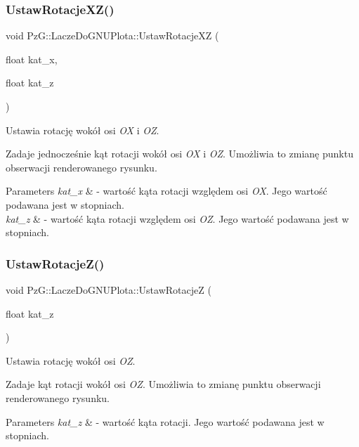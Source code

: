 \subsubsection{\texorpdfstring{Ustaw\+Rotacje\+X\+Z()}{UstawRotacjeXZ()}}
{\footnotesize\ttfamily void Pz\+G\+::\+Lacze\+Do\+G\+N\+U\+Plota\+::\+Ustaw\+Rotacje\+XZ (\begin{DoxyParamCaption}\item[{float}]{kat\+\_\+x,  }\item[{float}]{kat\+\_\+z }\end{DoxyParamCaption})\hspace{0.3cm}{\ttfamily [inline]}}



Ustawia rotację wokół osi {\itshape OX} i {\itshape OZ}. 

Zadaje jednocześnie kąt rotacji wokół osi {\itshape OX} i {\itshape OZ}. Umożliwia to zmianę punktu obserwacji renderowanego rysunku. 
\begin{DoxyParams}{Parameters}
{\em kat\+\_\+x} & -\/ wartość kąta rotacji względem osi {\itshape OX}. Jego wartość podawana jest w stopniach. \\
\hline
{\em kat\+\_\+z} & -\/ wartość kąta rotacji względem osi {\itshape OZ}. Jego wartość podawana jest w stopniach. \\
\hline
\end{DoxyParams}
\mbox{\label{classPzG_1_1LaczeDoGNUPlota_a458399aa2a8f4b3f00ccd5b272857ea1}} 
\subsubsection{\texorpdfstring{Ustaw\+Rotacje\+Z()}{UstawRotacjeZ()}}
{\footnotesize\ttfamily void Pz\+G\+::\+Lacze\+Do\+G\+N\+U\+Plota\+::\+Ustaw\+RotacjeZ (\begin{DoxyParamCaption}\item[{float}]{kat\+\_\+z }\end{DoxyParamCaption})\hspace{0.3cm}{\ttfamily [inline]}}



Ustawia rotację wokół osi {\itshape OZ}. 

Zadaje kąt rotacji wokół osi {\itshape OZ}. Umożliwia to zmianę punktu obserwacji renderowanego rysunku. 
\begin{DoxyParams}{Parameters}
{\em kat\+\_\+z} & -\/ wartość kąta rotacji. Jego wartość podawana jest w stopniach. \\
\hline
\end{DoxyParams}
\mbox{\label{classPzG_1_1LaczeDoGNUPlota_a855b8338bfe3e5d294d719f24b11090e}} 
